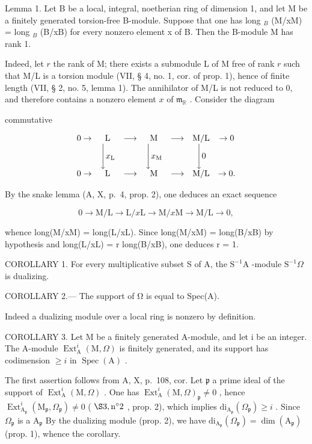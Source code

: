 Lemma 1. Let B be a local, integral, noetherian ring of dimension 1, and let M be a finitely generated torsion-free B-module. Suppose that one has long \(_{B}\) (M/xM) = long \(_{B}\) (B/xB) for every nonzero element x of B. Then the B-module M has rank 1.

Indeed, let \(r\) the rank of M; there exists a submodule L of M free of rank \(r\) such that M/L is a torsion module (VII, § 4, no. 1, cor. of prop. 1), hence of finite length (VII, § 2, no. 5, lemma 1). The annihilator of M/L is not reduced to 0, and therefore contains a nonzero element \(x\) of \(\mathfrak{m}_{\mathbb{R}}\) . Consider the diagram

commutative

\[
\begin{array}{c c c c c c c} 0 \to & \mathrm{L} & \longrightarrow & \mathrm{M} & \longrightarrow & \mathrm{M} / \mathrm{L} & \to 0 \\ & \Biggl \downarrow x _ {\mathrm{L}} & & \Biggl \downarrow x _ {\mathrm{M}} & & \Biggl \downarrow 0 \\ 0 \to & \mathrm{L} & \longrightarrow & \mathrm{M} & \longrightarrow & \mathrm{M} / \mathrm{L} & \to 0. \end{array}
\]

By the snake lemma (A, X, p.~4, prop. 2), one deduces an exact sequence

\[
0 \rightarrow \mathrm{M} / \mathrm{L} \longrightarrow \mathrm{L} / x \mathrm{L} \longrightarrow \mathrm{M} / x \mathrm{M} \longrightarrow \mathrm{M} / \mathrm{L} \rightarrow 0,
\]

whence long(M/xM) = long(L/xL). Since long(M/xM) = long(B/xB) by hypothesis and long(L/xL) = r long(B/xB), one deduces r = 1.

COROLLARY 1. For every multiplicative subset S of A, the \(\mathrm{S}^{-1}\mathrm{A}\) -module \(\mathrm{S}^{-1}\Omega\) is dualizing.

COROLLARY 2.--- The support of Ω is equal to Spec(A).

Indeed a dualizing module over a local ring is nonzero by definition.

COROLLARY 3. Let M be a finitely generated A-module, and let i be an integer. The A-module \(\operatorname{Ext}_{\mathrm{A}}^{i}(\mathrm{M},\Omega)\) is finitely generated, and its support has codimension \(\geqslant i\) in \(\operatorname{Spec}(\mathrm{A})\) .

The first assertion follows from A, X, p.~108, cor. Let \(\mathfrak{p}\) a prime ideal of the support of \(\operatorname{Ext}_{\mathrm{A}}^{i}(\mathrm{M},\Omega)\) . One has \(\operatorname{Ext}_{\mathrm{A}}^{i}(\mathrm{M},\Omega)_{\mathfrak{p}} \neq 0\) , hence \(\operatorname{Ext}_{\mathrm{A}_{\mathfrak{p}}}^{i}(\mathrm{M}_{\mathfrak{p}},\Omega_{\mathfrak{p}}) \neq 0\) ( \(\S 3, \mathrm{n}^{\circ}2\) , prop. 2), which implies \(\mathrm{di}_{\mathrm{A}_{\mathfrak{p}}}(\Omega_{\mathfrak{p}}) \geqslant i\) . Since \(\Omega_{\mathfrak{p}}\) is a \(\mathrm{A}_{\mathfrak{p}}\) By the dualizing module (prop. 2), we have \(\mathrm{di}_{\mathrm{A}_{\mathfrak{p}}}(\Omega_{\mathfrak{p}}) = \dim(\mathrm{A}_{\mathfrak{p}})\) (prop. 1), whence the corollary.

